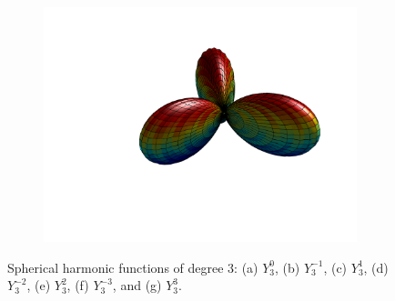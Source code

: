 \begin{figure}
\begin{subfigure}[b]{0.40\textwidth}
		\includegraphics[width=\textwidth]{figures/appendices/Y_3_3.png}
		\caption{}
	\end{subfigure}
\caption{Spherical harmonic functions of degree 3: (a) $Y_{3}^{0}$, (b) $Y_{3}^{-1}$, (c) $Y_{3}^{1}$, (d) $Y_{3}^{-2}$, (e) $Y_{3}^{2}$, (f) $Y_{3}^{-3}$, and (g) $Y_{3}^{3}$.}
\end{figure}

\fi